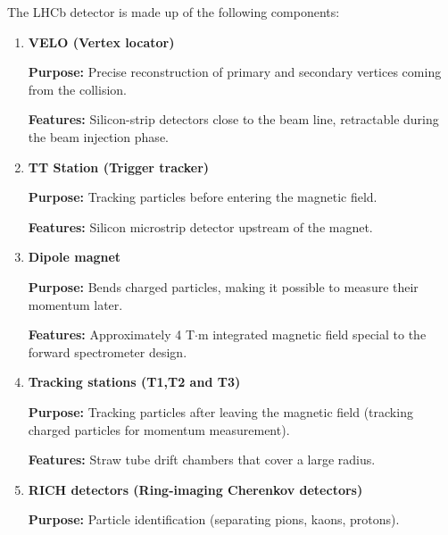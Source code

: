 The LHCb detector is made up of the following components:
\begin{enumerate}[label=\textbf{\arabic*.}]
    \item \textbf{VELO (Vertex locator)}
    
    \textbf{Purpose:} Precise reconstruction of primary and secondary vertices coming \\from the collision.
    
    \textbf{Features:} Silicon-strip detectors close to the beam line, retractable during the beam injection phase.
    \item \textbf{TT Station (Trigger tracker)}
    
    \textbf{Purpose:} Tracking particles before entering the magnetic field.
    
    \textbf{Features:} Silicon microstrip detector upstream of the magnet.
    \item \textbf{Dipole magnet}
    
    \textbf{Purpose:} Bends charged particles, making it possible to measure their momentum later.
        
    \textbf{Features:} Approximately 4 T$\cdot$m integrated magnetic field special to the forward spectrometer design.
    \item \textbf{Tracking stations (T1,T2 and T3)}
    
    \textbf{Purpose:} Tracking particles after leaving the magnetic field (tracking charged particles for momentum measurement).
    
    \textbf{Features:} Straw tube drift chambers that cover a large radius.
    \item \textbf{RICH detectors (Ring-imaging Cherenkov detectors)}
    
    \textbf{Purpose:} Particle identification (separating pions, kaons, protons).
    

\end{enumerate}
